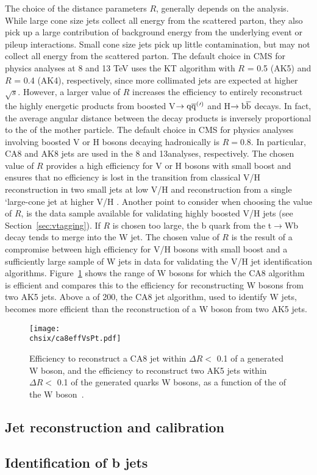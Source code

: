 The choice of the distance parameters $R$, generally depends on the analysis. While large cone size jets collect all energy from the scattered parton, they also pick up a large contribution of background energy from the underlying event or pileup interactions. Small cone size jets pick up little contamination, but may not collect all energy from the scattered parton. 
The default choice in CMS for physics analyses at 8 and 13 TeV uses the KT algorithm with $R$ = 0.5 (AK5) and $R$ = 0.4 (AK4), respectively, since more collimated jets are expected at higher $\sqrt{s}$.
However, a larger value of $R$ increases the efficiency to entirely reconstruct the highly energetic products from boosted V$\rightarrow\mathrm{q}\overline{\mathrm{q}}^({}'^){}$ and H$\rightarrow{\mathrm{b}\overline{\mathrm{b}}}$ decays. In fact, the average angular distance between the decay products is inversely proportional to the \pt of the mother particle. The default choice in CMS for physics analyses involving boosted V or H bosons decaying hadronically is $R = 0.8$. In particular, CA8 and AK8 jets are used in the 8 and 13\TeV analyses, respectively. The chosen value of $R$ provides a high efficiency for V or H bosons with small boost and ensures that no efficiency is lost in the transition from classical V/H reconstruction in two small jets at low V/H \pt and reconstruction from a single `large-cone jet at higher V/H \pt. Another point to consider when choosing the value of $R$, is the \ttbar data sample available for validating highly boosted V/H jets (see Section~\ref{sec:vtagging}). If $R$ is chosen too large, the b quark from the t$\rightarrow$Wb decay tends to merge into the W jet. The chosen value of $R$ is the result of a compromise between high efficiency for V/H bosons with small boost and a sufficiently large sample of W jets in \ttbar data for validating the V/H jet identification algorithms. Figure~\ref{fig:ca8effVsPt} shows the \pt range of W bosons for which the CA8 algorithm is efficient and compares this to the efficiency for reconstructing W bosons from two AK5 jets. Above a \pt of 200\GeV, the CA8 jet algorithm, used to identify W jets, becomes more efficient than the reconstruction of a W boson from two AK5 jets.

\begin{figure}[!htb]
 \begin{center}
  \texttt{[image: \\chsix/ca8effVsPt.pdf]}
 \end{center}
 \caption{Efficiency to reconstruct a CA8 jet within $\Delta R <$ 0.1 of a generated W boson, and the efficiency to reconstruct two AK5 jets within $\Delta R <$ 0.1 of the generated quarks W bosons, as a function of the \pt of the W boson~\cite{Khachatryan:2014vla}.}
 \label{fig:ca8effVsPt}
\end{figure}

\subsection{Jet reconstruction and calibration}\label{subsec:jetsreco}

\subsection{Identification of b jets}\label{subsec:bjets}

